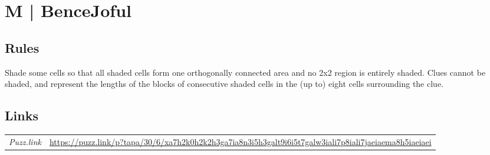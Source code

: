 \section{M | {\normalfont BenceJoful}}
\label{sec:50-m-bencejoful}

\subsection*{Rules}
\begin{markdown}
Shade some cells so that all shaded cells form one orthogonally connected area and no 2x2 region is entirely shaded. Clues cannot be shaded, and represent the lengths of the blocks of consecutive shaded cells in the (up to) eight cells surrounding the clue.
\end{markdown}
\subsection*{Links}
\begin{tabularx}{\textwidth}{l X}
\emph{Puzz.link} & \url{https://puzz.link/p?tapa/30/6/xa7h2k0h2k2h3ga7ia8n3i5h3galt9i6i5t7galw3iali7p8iali7jaeiaema8h5iaeiaei} \\
\end{tabularx}
\pagebreak
